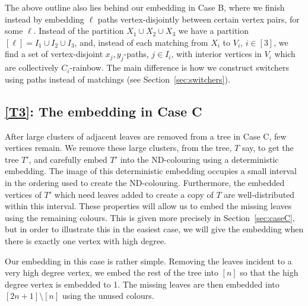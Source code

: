 The above outline also lies behind our embedding in Case B, where we finish instead by embedding $\ell$ paths vertex-disjointly between certain vertex pairs, for some $\ell$. Instead of the partition $X_1\cup X_2\cup X_3$ we have a partition $[\ell]=I_1\cup I_2\cup I_3$, and, instead of each matching from $X_i$ to $V_i$, $i\in [3]$, we find a set of vertex-disjoint $x_j,y_j$-paths, $j\in I_i$, with interior vertices in $V_i$ which are collectively $C_i$-rainbow. The main difference is how we construct switchers using paths instead of matchings (see Section~\ref{sec:switchers}).






\subsection{\ref{T3}: The embedding in Case C}\label{sec:T3}
After large clusters of adjacent leaves are removed from a tree in Case C, few vertices remain. We remove these large clusters, from the tree, $T$ say, to get the tree $T'$, and carefully embed $T'$ into the ND-colouring using a deterministic embedding. The image of this deterministic embedding occupies a small interval in the ordering used to create the ND-colouring. Furthermore, the embedded vertices of $T'$ which need leaves added to create a copy of $T$ are well-distributed within this interval. These properties will allow us to embed the missing leaves using the remaining colours. This is given more precisely in Section~\ref{sec:caseC}, but in order to illustrate this in the easiest case, we will give the embedding when there is exactly one vertex with high degree.


Our embedding in this case is rather simple. Removing the leaves incident to a very high degree vertex, we embed the rest of the tree into $[n]$ so that the high degree vertex is embedded to 1. The missing leaves are then embedded into $[2n+1]\setminus [n]$ using the unused colours.

